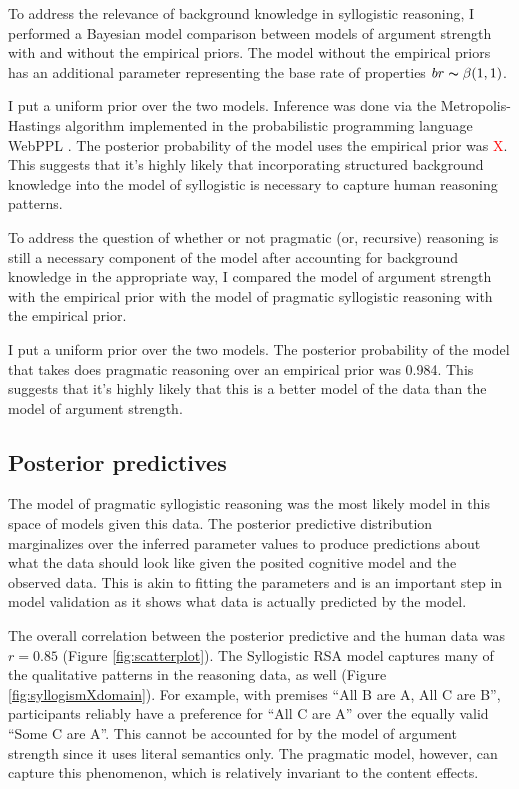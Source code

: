 \documentclass{llncs} %
\newcommand{\red}[1]{\textcolor{Red}{#1}}
\begin{document}
To address the relevance of background knowledge in syllogistic reasoning, I performed a Bayesian model comparison between models of argument strength with and without the empirical priors. The model without the empirical priors has an additional parameter representing the base rate of properties  $br \thicksim \beta(1,1)$.

I put a uniform prior over the two models. Inference was done via the Metropolis-Hastings algorithm implemented in the probabilistic programming language WebPPL \cite{dippl}. The posterior probability of the model uses the empirical prior was \red{X}. This suggests that it's highly likely that incorporating structured background knowledge into the model of syllogistic is necessary to capture human reasoning patterns.

To address the question of whether or not pragmatic (or, recursive) reasoning is still a necessary component of the model after accounting for background knowledge in the appropriate way, I compared the model of argument strength with the empirical prior with the model of pragmatic syllogistic reasoning with the empirical prior. 

I put a uniform prior over the two models. The posterior probability of the model that takes does pragmatic reasoning over an empirical prior was 0.984. This suggests that it's highly likely that this is a better model of the data than the model of argument strength. 

\subsection{Posterior predictives}

The model of pragmatic syllogistic reasoning was the most likely model in this space of models given this data. The posterior predictive distribution marginalizes over the inferred parameter values to produce predictions about what the data should look like given the posited cognitive model and the observed data. This is akin to fitting the parameters and is an important step in model validation as it shows what data is actually predicted by the model.

The overall correlation between the posterior predictive and the human data was $r = 0.85$ (Figure \ref{fig:scatterplot}). The Syllogistic RSA model captures many of the qualitative patterns in the reasoning data, as well (Figure \ref{fig:syllogismXdomain}). For example, with premises ``All B are A, All C are B'', participants reliably have a preference for ``All C are A'' over the equally valid ``Some C are A''. This cannot be accounted for by the model of argument strength since it uses literal semantics only. The pragmatic model, however, can capture this phenomenon, which is relatively invariant to the content effects.
\end{document}
